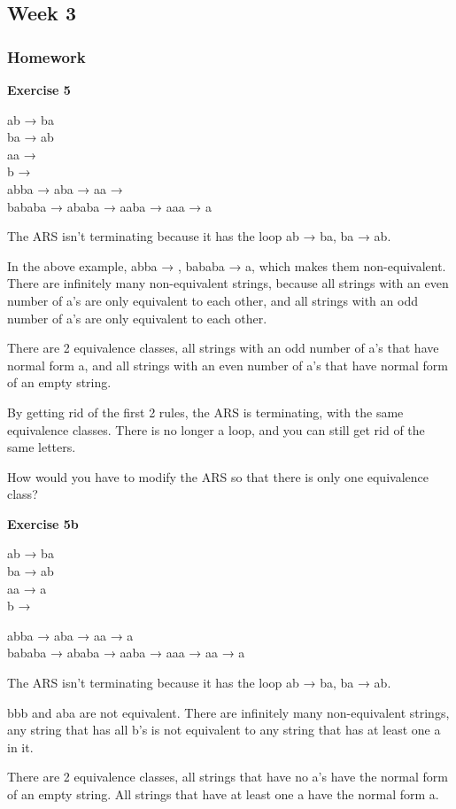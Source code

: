 \documentclass{article}
\theoremstyle{theorem}
\theoremstyle{definition}
\theoremstyle{remark}
\begin{document}
\subsection{Week 3}

\subsubsection{Homework}

\textbf{Exercise 5}

ab → ba\\
ba → ab\\
aa →\\
b →\\

abba → aba → aa →\\
bababa → ababa → aaba → aaa → a

The ARS isn’t terminating because it has the loop ab → ba, ba → ab.

In the above example, abba → , bababa → a, which makes them non-equivalent. There are infinitely many non-equivalent strings, because all strings with an even number of a’s are only equivalent to each other, and all strings with an odd number of a’s are only equivalent to each other.

There are 2 equivalence classes, all strings with an odd number of a’s that have normal form a, and all strings with an even number of a’s that have normal form of an empty string.

By getting rid of the first 2 rules, the ARS is terminating, with the same equivalence classes. There is no longer a loop, and you can still get rid of the same letters.

How would you have to modify the ARS so that there is only one equivalence class?

\textbf{Exercise 5b}

ab → ba\\
ba → ab\\
aa → a\\
b →

abba → aba → aa → a\\
bababa → ababa → aaba → aaa → aa → a

The ARS isn’t terminating because it has the loop ab → ba, ba → ab.

bbb and aba are not equivalent. There are infinitely many non-equivalent strings, any string that has all b’s is not equivalent to any string that has at least one a in it.

There are 2 equivalence classes, all strings that have no a’s have the normal form of an empty string. All strings that have at least one a have the normal form a.
\end{document}
